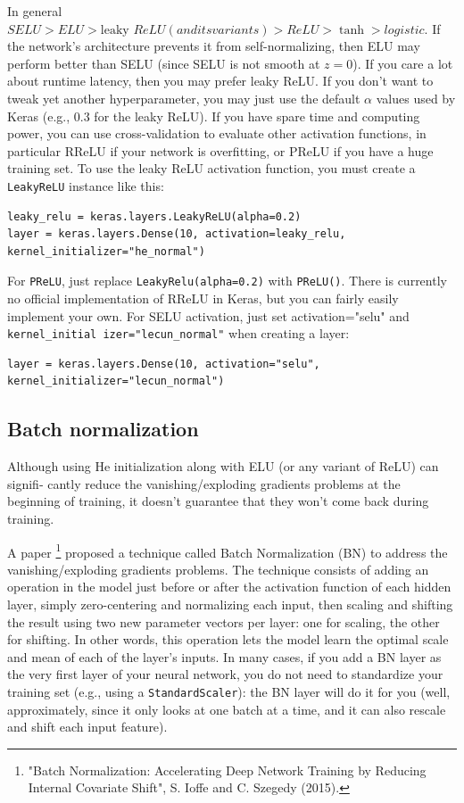 \documentclass[12pt, letterpaper]{article}
\theoremstyle{definition}
\begin{document}
In general $SELU > ELU > \text{leaky }ReLU (and its variants) > ReLU > \tanh > logistic$. If the network's architecture prevents it from self-normalizing, then ELU may perform better than SELU (since SELU is not smooth at $z = 0$). If you care a lot about runtime latency, then you may prefer leaky ReLU. If you don't want to tweak yet another hyperparameter, you may just use the default $\alpha$ values used by Keras (e.g., $0.3$ for the leaky ReLU). If you have spare time and computing power, you can use cross-validation to evaluate other activation functions, in particular RReLU if your network is overfitting, or PReLU if you have a huge training set.
To use the leaky ReLU activation function, you must create a \lstinline+LeakyReLU+ instance like this:
\begin{lstlisting}
leaky_relu = keras.layers.LeakyReLU(alpha=0.2)
layer = keras.layers.Dense(10, activation=leaky_relu, kernel_initializer="he_normal")
\end{lstlisting}
For \lstinline+PReLU+, just replace \lstinline+LeakyRelu(alpha=0.2)+ with \lstinline+PReLU()+.
There is currently no official implementation of RReLU in Keras, but you can fairly easily implement your own. For SELU activation, just set activation="selu" and \lstinline+kernel_initial izer="lecun_normal"+ when creating a layer:
\begin{lstlisting}
layer = keras.layers.Dense(10, activation="selu", kernel_initializer="lecun_normal")
\end{lstlisting}

\subsection{Batch normalization}
Although using He initialization along with ELU (or any variant of ReLU) can signifi‐ cantly reduce the vanishing/exploding gradients problems at the beginning of training, it doesn’t guarantee that they won't come back during training.

A paper \footnote{"Batch Normalization: Accelerating Deep Network Training by Reducing Internal Covariate Shift", S. Ioffe and C. Szegedy (2015).} proposed a technique called Batch Normalization (BN) to address the vanishing/exploding gradients problems. The technique consists of adding an operation in the model just before or after the activation function of each hidden layer, simply zero-centering and normalizing each input, then scaling and shifting the result using two new parameter vectors per layer: one for scaling, the other for shifting. In other words, this operation lets the model learn the optimal scale and mean of each of the layer's inputs. In many cases, if you add a BN layer as the very first layer of your neural network, you do not need to standardize your training set (e.g., using a \lstinline+StandardScaler+): the BN layer will do it for you (well, approximately, since it only looks at one batch at a time, and it can also rescale and shift each input feature).
\end{document}
